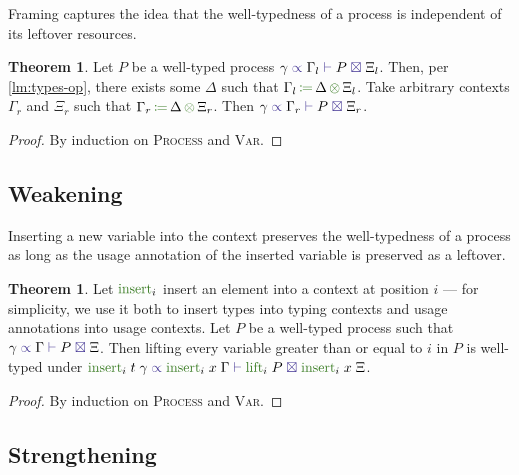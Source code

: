 \documentclass[a4paper,UKenglish,cleveref,autoref,thm-restate,authorcolumns]{lipics-v2019}
\theoremstyle{definition}
\newtheorem{nitheorem}[theorem]{Theorem}
\newcommand{\type}[1]{\textcolor{BlueViolet}{\operatorname{#1}}}
\newcommand{\func}[1]{\textcolor{OliveGreen}{\operatorname{#1}}}
\newcommand{\opctx}[3]{#1 \, \func{\coloneqq} \, #2 \, \func{\otimes} \, #3}
\newcommand{\types}[4]{#1 \; \type{\propto} \; #2 \; \type{\vdash} \; #3 \; \type{\boxtimes} \; #4}
\begin{document}
Framing captures the idea that the well-typedness of a process is independent of its leftover resources.
\begin{nitheorem}
  \label{thm:framing}
  Let $P$ be a well-typed process $\types{\gamma}{\Gamma_l}{P}{\Xi_l}$.
  Then, per \autoref{lm:types-op}, there exists some $\Delta$ such that $\opctx{\Gamma_l}{\Delta}{\Xi_l}$.
  Take arbitrary contexts $\Gamma_r$ and $\Xi_r$ such that $\opctx{\Gamma_r}{\Delta}{\Xi_r}$.
  Then $\types{\gamma}{\Gamma_r}{P}{\Xi_r}$.
\end{nitheorem}
\begin{proof}
  By induction on \textsc{Process} and \textsc{Var}.
\end{proof}

\subsection{Weakening}
\label{weakening}

Inserting a new variable into the context preserves the well-typedness of a process as long as the usage annotation of the inserted variable is preserved as a leftover.

\begin{nitheorem}
  \label{thm:weakening}
  Let $\func{insert}_i$ insert an element into a context at position $i$ --- for simplicity, we use it both to insert types into typing contexts and usage annotations into usage contexts.
  Let $P$ be a well-typed process such that $\types{\gamma}{\Gamma}{P}{\Xi}$.
  Then lifting every variable greater than or equal to $i$ in $P$ is well-typed under $\types{\func{insert}_i \; t \; \gamma}{\func{insert}_i \; x \; \Gamma}{\func{lift}_i \; P}{\func{insert}_i \; x \; \Xi}$.
\end{nitheorem}
\begin{proof}
  By induction on \textsc{Process} and \textsc{Var}.
\end{proof}

\subsection{Strengthening}
\label{strengthening}
\end{document}

